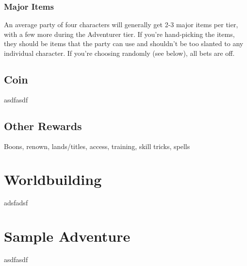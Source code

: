 \documentclass[10pt,twoside,openany,bg=none]{dndbook}
\begin{document}
\subsubsection{Major Items}
An average party of four characters will generally get 2-3 major items per tier, with a few more during the Adventurer tier. If you're hand-picking the items, they should be items that the party can use and shouldn't be too slanted to any individual character. If you're choosing randomly (see below), all bets are off.

\subsection{Coin}
asdfasdf

\subsection{Other Rewards}
Boons, renown, lands/titles, access, training, skill tricks, spells

\section{Worldbuilding}\label{sec:worldbuilding}
adsfadsf

\section{Sample Adventure}\label{sec:sample-adventure}
asdfasdf
\end{document}
